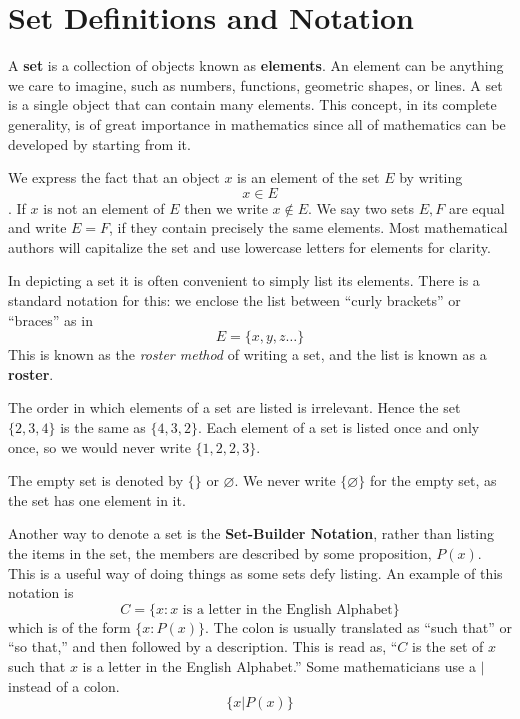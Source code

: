 \section{Set Definitions and Notation}

A \textbf{set} is a collection of objects known as \textbf{elements}. An element can be
anything we care to imagine, such as numbers, functions, geometric shapes, or lines. A set is a single
object that can contain many elements. This concept, in its  complete generality, is of great importance in mathematics since all of mathematics can be developed by starting from it. 


We express the fact that an object $x$ is an element of the set $E$ by writing \[x \in E \]. If $x$ is not an element of $E$ then we write $x \not\in E$. We say two sets $E,F$ are equal and write $E=F$, if they contain precisely the same elements. Most mathematical authors will capitalize the set and use lowercase letters for elements for clarity.

In depicting a set it is often convenient to simply list its elements. There is a standard notation for this: we enclose the list between \enquote{curly brackets} or \enquote{braces} as in
\[ E = \{x,y,z\dots\} \]
This is known as the \emph{roster method} of writing a set, and the list is known as a \textbf{roster}. 

The order in which elements of a set are listed is irrelevant. Hence the set $\{2,3,4\}$ is the same as $\{4,3,2\}$. Each element of a set is listed once and only once, so we would never write $\{1,2,2,3\}$.

The empty set is denoted by $\{\}$ or $\varnothing$.  We never write $\{\varnothing\}$ for the empty set, as the set has one element in it.

Another way to denote a set is the \textbf{Set-Builder Notation}, rather than
listing the items in the set, the members are described by some proposition, $P(x)$.
This is a useful way of doing things as some sets defy listing. An example of this
notation is
\[ C = \{x : x \text{ is a letter in the English Alphabet}\}\]
which is of the form $\{x:P(x)\}$. The colon is usually translated as \enquote{such that} or
\enquote{so that,} and then followed by a description. This is read as, ``$C$ is the set of $x$ such
that $x$ is a letter in the English Alphabet.'' Some mathematicians use a $\vert$ instead of a colon.
\[ \{x \vert P(x)\}\]

\makeatletter
\newif\if@suchthatsymbol
\@suchthatsymbolfalse
\def\suchthat{%
  \if@suchthatsymbol
    \expandafter\vert
  \else
    \expandafter\text{ such that }  
  \fi  
}
\makeatother

